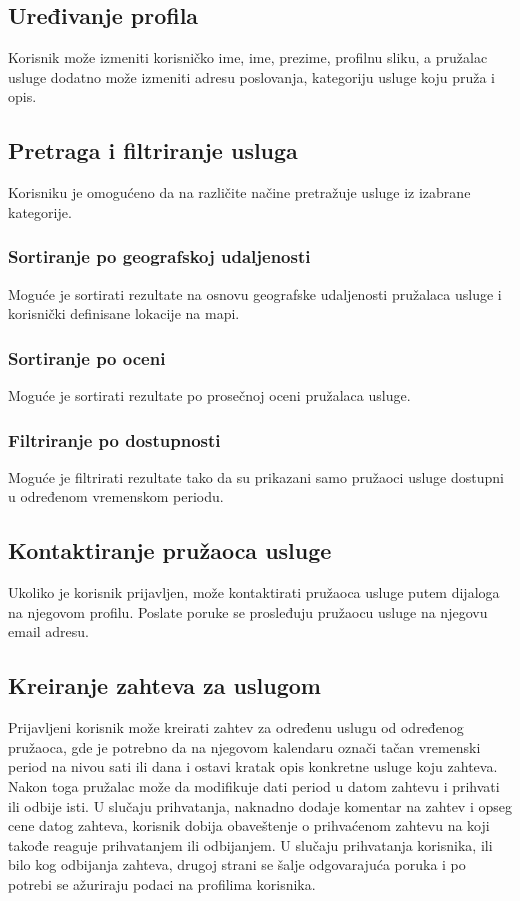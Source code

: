 \documentclass[a4paper,12pt]{report}
\begin{document}
\subsection{Uređivanje profila}
Korisnik može izmeniti korisničko ime, ime, prezime, profilnu sliku, a pružalac usluge dodatno može izmeniti adresu poslovanja, kategoriju usluge koju pruža i opis.

\subsection{Pretraga i filtriranje usluga}
Korisniku je omogućeno da na različite načine pretražuje usluge iz izabrane kategorije.
\subsubsection{Sortiranje po geografskoj udaljenosti}
Moguće je sortirati rezultate na osnovu geografske udaljenosti pružalaca usluge i korisnički definisane lokacije na mapi.
\subsubsection{Sortiranje po oceni}
Moguće je sortirati rezultate po prosečnoj oceni pružalaca usluge.
\subsubsection{Filtriranje po dostupnosti}
Moguće je filtrirati rezultate tako da su prikazani samo pružaoci usluge dostupni u određenom vremenskom periodu.
\subsection{Kontaktiranje pružaoca usluge}
Ukoliko je korisnik prijavljen, može kontaktirati pružaoca usluge putem dijaloga na njegovom profilu. Poslate poruke se prosleđuju pružaocu usluge na njegovu email adresu.
\subsection{Kreiranje zahteva za uslugom}
Prijavljeni korisnik može kreirati zahtev za određenu uslugu od određenog pružaoca, gde je potrebno da na njegovom kalendaru označi tačan vremenski period na nivou sati ili dana i ostavi kratak opis konkretne usluge koju zahteva. Nakon toga pružalac može da modifikuje dati period u datom zahtevu i prihvati ili odbije isti. U slučaju prihvatanja, naknadno dodaje komentar na zahtev i opseg cene datog zahteva, korisnik dobija obaveštenje o prihvaćenom zahtevu na koji takođe reaguje prihvatanjem ili odbijanjem. U slučaju prihvatanja korisnika, ili bilo kog odbijanja zahteva, drugoj strani se šalje odgovarajuća poruka i po potrebi se ažuriraju podaci na profilima korisnika. 
\end{document}
